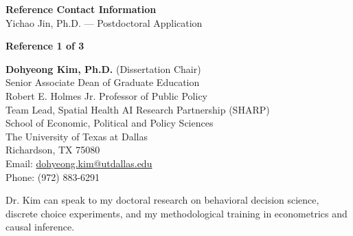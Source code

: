 \documentclass[11pt, letterpaper]{article}
\begin{document}
\thispagestyle{empty}

\begin{center}
    {\Large \textbf{Reference Contact Information}}\\
    \vspace{0.5em}
    Yichao Jin, Ph.D. --- Postdoctoral Application
\end{center}

\vspace{1.5em}

\begin{flushleft}
\textbf{Reference 1 of 3}
\end{flushleft}

\vspace{0.5em}

\begin{flushleft}
\textbf{Dohyeong Kim, Ph.D.} (Dissertation Chair)\\
\vspace{0.3em}
Senior Associate Dean of Graduate Education\\
Robert E. Holmes Jr. Professor of Public Policy\\
Team Lead, Spatial Health AI Research Partnership (SHARP)\\
School of Economic, Political and Policy Sciences\\
The University of Texas at Dallas\\
Richardson, TX 75080\\
\vspace{0.5em}
Email: \href{mailto:dohyeong.kim@utdallas.edu}{dohyeong.kim@utdallas.edu}\\
Phone: (972) 883-6291
\end{flushleft}

\vspace{1em}

\noindent Dr. Kim can speak to my doctoral research on behavioral decision science, discrete choice experiments, and my methodological training in econometrics and causal inference.
\end{document}
